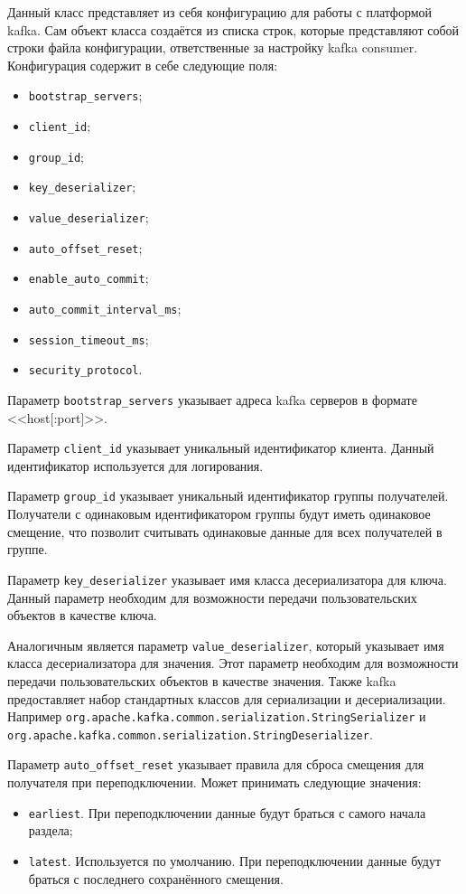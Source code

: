 Данный класс представляет из себя конфигурацию для работы с платформой kafka.
Сам объект класса создаётся из списка строк, которые представляют собой строки файла конфигурации, ответственные за настройку kafka consumer.
Конфигурация содержит в себе следующие поля:
\begin{itemize}
    \item \texttt{bootstrap\_servers};
    \item \texttt{client\_id};
    \item \texttt{group\_id};
    \item \texttt{key\_deserializer};
    \item \texttt{value\_deserializer};
    \item \texttt{auto\_offset\_reset};
    \item \texttt{enable\_auto\_commit};
    \item \texttt{auto\_commit\_interval\_ms};
    \item \texttt{session\_timeout\_ms};
    \item \texttt{security\_protocol}.
\end{itemize}

Параметр \texttt{bootstrap\_servers} указывает адреса kafka серверов в формате <<host[:port]>>.

Параметр \texttt{client\_id} указывает уникальный идентификатор клиента.
Данный идентификатор используется для логирования.

Параметр \texttt{group\_id} указывает уникальный идентификатор группы получателей.
Получатели с одинаковым идентификатором группы будут иметь одинаковое смещение, что позволит считывать одинаковые данные для всех получателей в группе.

Параметр \texttt{key\_deserializer} указывает имя класса десериализатора для ключа.
Данный параметр необходим для возможности передачи пользовательских объектов в качестве ключа.

Аналогичным является параметр \texttt{value\_deserializer}, который указывает имя класса десериализатора для значения.
Этот параметр необходим для возможности передачи пользовательских объектов в качестве значения.
Также kafka предоставляет набор стандартных классов для сериализации и десериализации.
Например \texttt{org.apache.kafka.common.serialization.StringSerializer} и \texttt{org.apache.kafka.common.serialization.StringDeserializer}.

Параметр \texttt{auto\_offset\_reset} указывает правила для сброса смещения для получателя при переподключении.
Может принимать следующие значения:
\begin{itemize}
    \item \texttt{earliest}. При переподключении данные будут браться с самого начала раздела;
    \item \texttt{latest}. Используется по умолчанию. При переподключении данные будут браться с последнего сохранённого смещения.   
\end{itemize}

